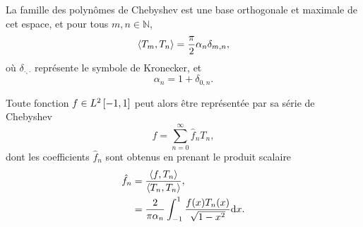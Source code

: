 La famille des polynômes de Chebyshev est une base orthogonale et maximale de cet espace, et pour tous $m,n \in \mathbb{N}$,
\begin{equation}
	\left \langle {T_m}, {T_n} \right \rangle =
	\frac{\pi}{2} \alpha_n \delta_{m,n},
	\label{eq:chebyshev_orthogonality}
\end{equation}
où $\delta_{\cdot,\cdot}$ représente le symbole de Kronecker, et
\begin{equation}
	\alpha_n = 
	1 + \delta_{0,n}.
\end{equation}

Toute fonction $f \in L^2\left[ -1, 1 \right]$ peut alors être représentée par sa série de Chebyshev
\begin{equation}
	f = \sum_{n=0}^{\infty} \hat{f}_n T_n,
	\label{eq:chebyshev_series}
\end{equation}
dont les coefficients $\hat{f}_n$ sont obtenus en prenant le produit scalaire
\begin{align}
	\hat{f}_n 
	&= \frac{\left \langle {f}, {T_n} \right \rangle}{\left \langle {T_n}, {T_n} \right \rangle}, \nonumber \\
	&= \frac{2}{\pi \alpha_n} \int_{-1}^{1} \frac{f(x) T_n(x)}{\sqrt{1 - x^2}} \mathrm{d}{x} .
	\label{eq:chebyshev_series_coeffs}
\end{align}

